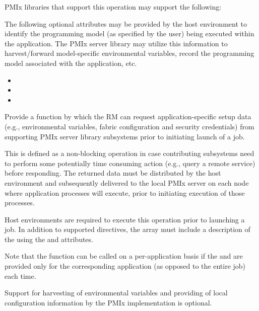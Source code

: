 \optattrstart
\ac{PMIx} libraries that support this operation may support the following:


The following optional attributes may be provided by the host environment to identify the programming model (as specified by the user) being executed within the application. The \ac{PMIx} server library may utilize this information to harvest/forward model-specific environmental variables, record the programming model associated with the application, etc.

\begin{itemize}
    \item {}
    \item {}
    \item {}
\end{itemize}

\optattrend

\descr

Provide a function by which the \ac{RM} can request application-specific setup data (e.g., environmental variables, fabric configuration and security credentials) from supporting \ac{PMIx} server library subsystems prior to initiating launch of a job.

This is defined as a non-blocking operation in case contributing subsystems need to perform some potentially time consuming action (e.g., query a remote service) before responding. The returned data must be distributed by the host environment and subsequently delivered to the local \ac{PMIx} server on each node where application processes will execute, prior to initiating execution of those processes.

\advicermstart
Host environments are required to execute this operation prior to launching a job. In addition to supported directives, the  array must include a description of the  using the  and  attributes.

Note that the function can be called on a per-application basis if the  and  are provided only for the corresponding application (as opposed to the entire job) each time.
\advicermend

\adviceimplstart
Support for harvesting of environmental variables and providing of local configuration information by the \ac{PMIx} implementation is optional.
\adviceimplend

